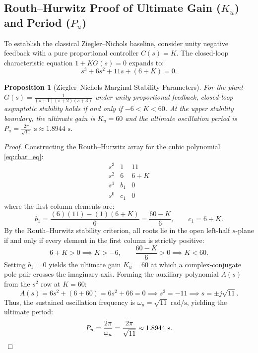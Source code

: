 \documentclass[11pt,a4paper]{article}
\newtheorem{proposition}{Proposition}
\begin{document}
\subsection{Routh--Hurwitz Proof of Ultimate Gain (\texorpdfstring{$K_u$}{Ku}) and Period (\texorpdfstring{$P_u$}{Pu})}
To establish the classical Ziegler--Nichols baseline, consider unity negative feedback with a pure proportional controller $C(s) = K$. The closed-loop characteristic equation $1 + K G(s) = 0$ expands to:
\begin{equation}
  s^3 + 6s^2 + 11s + (6 + K) = 0.
  \label{eq:char_eq}
\end{equation}

\begin{proposition}[Ziegler--Nichols Marginal Stability Parameters]
For the plant $G(s) = \frac{1}{(s+1)(s+2)(s+3)}$ under unity proportional feedback, closed-loop asymptotic stability holds if and only if $-6 < K < 60$. At the upper stability boundary, the ultimate gain is $K_u = 60$ and the ultimate oscillation period is $P_u = \frac{2\pi}{\sqrt{11}}\text{ s} \approx 1.8944\text{ s}$.
\end{proposition}

\begin{proof}
Constructing the Routh--Hurwitz array for the cubic polynomial \eqref{eq:char_eq}:
\[
\begin{array}{c|cc}
s^3 & 1 & 11 \\
s^2 & 6 & 6 + K \\
s^1 & b_1 & 0 \\
s^0 & c_1 & 0
\end{array}
\]
where the first-column elements are:
\[
  b_1 = \frac{(6)(11) - (1)(6 + K)}{6} = \frac{60 - K}{6}, \qquad c_1 = 6 + K.
\]
By the Routh--Hurwitz stability criterion, all roots lie in the open left-half $s$-plane if and only if every element in the first column is strictly positive:
\[
  6 + K > 0 \implies K > -6, \qquad \frac{60 - K}{6} > 0 \implies K < 60.
\]
Setting $b_1 = 0$ yields the ultimate gain $K_u = 60$ at which a complex-conjugate pole pair crosses the imaginary axis. Forming the auxiliary polynomial $A(s)$ from the $s^2$ row at $K = 60$:
\[
  A(s) = 6s^2 + (6 + 60) = 6s^2 + 66 = 0 \implies s^2 = -11 \implies s = \pm j\sqrt{11}.
\]
Thus, the sustained oscillation frequency is $\omega_u = \sqrt{11}\text{ rad/s}$, yielding the ultimate period:
\[
  P_u = \frac{2\pi}{\omega_u} = \frac{2\pi}{\sqrt{11}} \approx 1.8944\text{ s}. \qedhere
\]
\end{proof}
\end{document}

